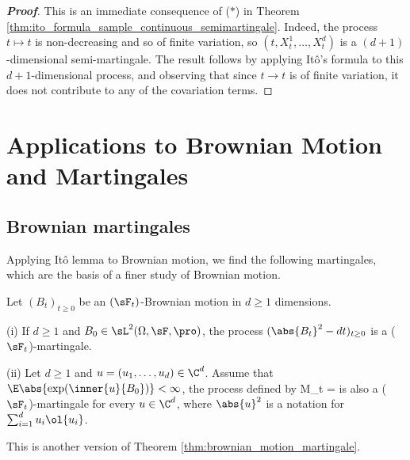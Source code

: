 \begin{proof}[\bf Proof]
This is an immediate consequence of ($*$) in Theorem \ref{thm:ito_formula_sample_continuous_semimartingale}. Indeed, the process $t \mapsto t$ is non-decreasing and so of finite variation, so $(t,X^1_t ,\dots,X^d_t)$ is a
$(d+1)$-dimensional semi-martingale. The result follows by applying It\^o's formula to this $d + 1$-dimensional process, and observing that since $t \to t$ is of finite variation, it does not contribute to any of the
covariation terms.
\end{proof}

\section{Applications to Brownian Motion and Martingales}

\subsection{Brownian martingales}

Applying It\^o lemma to Brownian motion, we find the following martingales, which are the basis of a finer study of Brownian motion.

\begin{theorem}\label{thm:brownian_motion_martingale_ito}
Let $(B_t)_{t \geq 0}$ be an $(\sF_t)$-Brownian motion in $d \geq 1$ dimensions.
\ben
\item [(i)] If $d \geq 1$ and $B_0 \in \sL^2(\Omega,\sF,\pro)$, the process $(\abs{B_t}^2 - dt)_{ t \geq 0}$ is a ($\sF_{t}$)-martingale.
\item [(ii)] Let $d \geq 1$ and $u = (u_1,\dots, u_d) \in \C^d$. %
Assume that $\E\abs{\exp(\inner{u}{B_0})} < \infty$, the process defined by
\be
M_t = \exp{}
\ee
is also a ($\sF_{t}$)-martingale for every $u \in \C^d$, where $\abs{u}^2$ is a notation for $\sum^d_{i=1} u_i\ol{u_i}$.
\een
\end{theorem}

\begin{remark}
This is another version of Theorem \ref{thm:brownian_motion_martingale}.
\end{remark}

